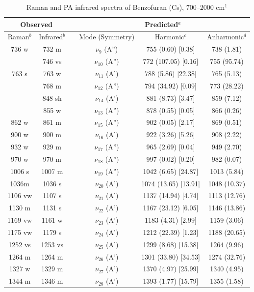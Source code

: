 \begin{table}[H]
	\caption{Raman and PA infrared spectra of Benzofuran (Cs), 700–2000 cm$^{1}$}
	\begin{center}
		\begin{tabular}{c c c c c c}
			\hline
			\multicolumn{ 2}{c}{Observed} & \multicolumn{1}{c}{} & \multicolumn{ 3}{c}{Predicted$^{a}$} \\ \hline
			Raman$^{b}$ & \multicolumn{1}{c}{Infrared$^{b}$} &  & \multicolumn{1}{c}{Mode (Symmetry)} & \multicolumn{1}{c}{Harmonic$^{c}$} & Anharmonic$^{d}$ \\ \hline
736 w & 732 m &  & $\nu_{9}$ (A”) & 755 (0.60) [0.38] & 738 (1.81) \\ 
& 746 vs &  & $\nu_{10}$ (A”) & 772 (107.05) [0.16] & 755 (95.74) \\ 
763 s & 763 w &  & $\nu_{11}$ (A’) & 788 (5.86) [22.38] & 765 (5.13) \\ 
& 768 m &  & $\nu_{12}$ (A”) & 794 (34.92) [0.09] & 773 (28.22) \\ 
& 848 sh &  & $\nu_{14}$ (A’) & 881 (8.73) [3.47] & 859 (7.12) \\ 
& 855 w &  & $\nu_{13}$ (A”) &     878 (0.55) [0.05] & 866 (0.26) \\ 
862 w & 861 m &  & $\nu_{15}$ (A”) & 902 (0.05) [2.17] & 869 (0.51) \\ 
900 w & 900 m &  &     $\nu_{16}$ (A’) & 922 (3.26) [5.26] & 908 (2.22) \\ 
932 w & 929 m &  & $\nu_{17}$ (A”) & 965 (2.69) [0.04] & 949 (2.70) \\ 
970 w & 970 m &  & $\nu_{18}$ (A”) & 997 (0.02) [0.20] & 982 (0.07) \\ 
1006 s & 1007 m &  & $\nu_{19}$ (A”) & 1042 (6.65) [24.87] & 1013 (5.84) \\ 
1036m & 1036 s &  & $\nu_{20}$ (A’)
&  1074 (13.65) [13.91] & 1048 (10.37) \\ 
1106 vw & 1107 s & \multicolumn{1}{c}{} & \multicolumn{1}{c}{$\nu_{21}$ (A’)} & 1137 (14.94) [4.74] & 1113 (12.76) \\ 
1130 m & 1131 s & \multicolumn{1}{c}{} & \multicolumn{1}{c}{$\nu_{22}$ (A’)} & 1167 (23.12) [6.05] & 1146 (13.86) \\ 
1169 vw & 1161 w & \multicolumn{1}{c}{} & \multicolumn{1}{c}{$\nu_{23}$ (A’)} &     1183 (4.31) [2.99] & 1159 (3.06) \\ 
1175 vw & 1179 s & \multicolumn{1}{c}{} & \multicolumn{1}{c}{$\nu_{24}$ (A’)
} & \multicolumn{1}{c}{   1212 (22.39) [1.23]} & 1188 (20.65) \\ 
1252 vs & 1253 vs & \multicolumn{1}{c}{} & \multicolumn{1}{c}{$\nu_{25}$ (A’)
} & 1299 (8.68) [15.38] & 1264 (9.96) \\ 
1264 m & 1264 m &  & $\nu_{26}$ (A’)& 1301 (33.80) [34.53] & 1274 (32.76) \\ 
1327 w & 1329 m &  & $\nu_{27}$ (A’) & 1370 (4.97) [25.99] & 1340 (4.95) \\ 
1344 m & 1346 m &  & $\nu_{28}$ (A’) & 1393 (1.77) [15.79] & 1355 (1.58)\\ 
\bottomrule
\end{tabular}
\end{center}
\end{table}


